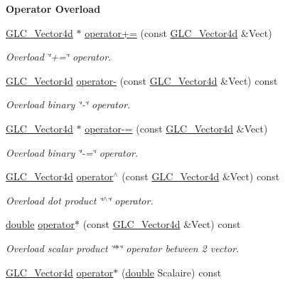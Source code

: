 \begin{Indent}{\bf Operator Overload}
\begin{DoxyCompactItemize}
\hyperlink{class_g_l_c___vector4d}{G\-L\-C\-\_\-\-Vector4d} $\ast$ \hyperlink{class_g_l_c___vector4d_a2e57439bc925bf4b9fdf5cb8715b8d3c}{operator+=} (const \hyperlink{class_g_l_c___vector4d}{G\-L\-C\-\_\-\-Vector4d} \&Vect)
\begin{DoxyCompactList}\small\item\em Overload \char`\"{}+=\char`\"{} operator. \end{DoxyCompactList}\item 
\hyperlink{class_g_l_c___vector4d}{G\-L\-C\-\_\-\-Vector4d} \hyperlink{class_g_l_c___vector4d_a72c56dcd0f1485e49e9d65cc146448a6}{operator-\/} (const \hyperlink{class_g_l_c___vector4d}{G\-L\-C\-\_\-\-Vector4d} \&Vect) const 
\begin{DoxyCompactList}\small\item\em Overload binary \char`\"{}-\/\char`\"{} operator. \end{DoxyCompactList}\item 
\hyperlink{class_g_l_c___vector4d}{G\-L\-C\-\_\-\-Vector4d} $\ast$ \hyperlink{class_g_l_c___vector4d_aa68f08572981968aa2a92337fcdacb2b}{operator-\/=} (const \hyperlink{class_g_l_c___vector4d}{G\-L\-C\-\_\-\-Vector4d} \&Vect)
\begin{DoxyCompactList}\small\item\em Overload binary \char`\"{}-\/=\char`\"{} operator. \end{DoxyCompactList}\item 
\hyperlink{class_g_l_c___vector4d}{G\-L\-C\-\_\-\-Vector4d} \hyperlink{class_g_l_c___vector4d_a44a9c6189115c5d9944724cf80cf7555}{operator$^\wedge$} (const \hyperlink{class_g_l_c___vector4d}{G\-L\-C\-\_\-\-Vector4d} \&Vect) const 
\begin{DoxyCompactList}\small\item\em Overload dot product \char`\"{}$^\wedge$\char`\"{} operator. \end{DoxyCompactList}\item 
\hyperlink{_super_l_u_support_8h_a8956b2b9f49bf918deed98379d159ca7}{double} \hyperlink{class_g_l_c___vector4d_a2c40efd1ee2836167be23aadb60b0f1b}{operator$\ast$} (const \hyperlink{class_g_l_c___vector4d}{G\-L\-C\-\_\-\-Vector4d} \&Vect) const 
\begin{DoxyCompactList}\small\item\em Overload scalar product \char`\"{}$\ast$\char`\"{} operator between 2 vector. \end{DoxyCompactList}\item 
\hyperlink{class_g_l_c___vector4d}{G\-L\-C\-\_\-\-Vector4d} \hyperlink{class_g_l_c___vector4d_acc00fec9945e65fd019cdbab94fe92de}{operator$\ast$} (\hyperlink{_super_l_u_support_8h_a8956b2b9f49bf918deed98379d159ca7}{double} Scalaire) const 

\end{DoxyCompactItemize}
\end{Indent}
